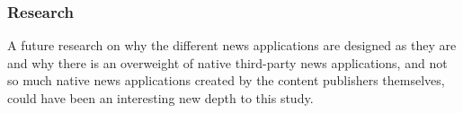 \subsubsection{Research}
A future research on why the different news applications are designed as they are and why there is an overweight of native third-party news applications, and not so much native news applications created by the content publishers themselves, could have been an interesting new depth to this study.